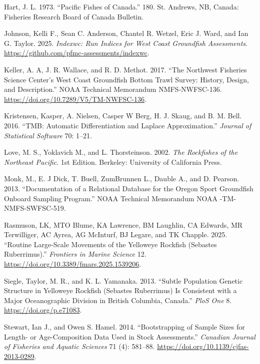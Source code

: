 \documentclass[
]{scrartcl}
\newlength{\cslhangindent}
\newenvironment{CSLReferences}[2] %
 {\begin{list}{}{%
  \setlength{\itemindent}{0pt}
  \setlength{\leftmargin}{0pt}
  \setlength{\parsep}{0pt}
  \ifodd #1
   \setlength{\leftmargin}{\cslhangindent}
   \setlength{\itemindent}{-1\cslhangindent}
  \fi
  \setlength{\itemsep}{#2\baselineskip}}}
 {\end{list}}
\begin{document}
\begin{CSLReferences}{1}{0}
Hart, J. L. 1973. {``Pacific Fishes of {C}anada.''} 180. St. Andrews,
NB, Canada: Fisheries Research Board of Canada Bulletin.

Johnson, Kelli F., Sean C. Anderson, Chantel R. Wetzel, Eric J. Ward,
and Ian G. Taylor. 2025. \emph{Indexwc: Run Indices for West Coast
Groundfish Assessments}.
\url{https://github.com/pfmc-assessments/indexwc}.

Keller, A. A, J. R. Wallace, and R. D. Methot. 2017. {``The Northwest
Fisheries Science Center's West Coast Groundfish Bottom Trawl Survey:
History, Design, and Description.''} NOAA Technical Memorandum
NMFS-NWFSC-136. \url{https://doi.org/10.7289/V5/TM-NWFSC-136}.

Kristensen, Kasper, A. Nielsen, Casper W Berg, H. J. Skaug, and B. M.
Bell. 2016. {``{TMB}: {Automatic} {Differentiation} and {Laplace}
{Approximation}.''} \emph{Journal of Statistical Software} 70: 1--21.

Love, M. S., Yoklavich M., and L. Thorsteinson. 2002. \emph{The
{Rockfishes} of the {Northeast} {Pacific}}. 1st Edition. Berkeley:
University of California Press.

Monk, M., E. J Dick, T. Buell, ZumBrunnen L., Dauble A., and D. Pearson.
2013. {``Documentation of a Relational Database for the Oregon Sport
Groundfish Onboard Sampling Program.''} NOAA Technical Memorandum NOAA
-TM-NMFS-SWFSC-519.

Rasmuson, LK, MTO Blume, KA Lawrence, BM Laughlin, CA Edwards, MR
Terwilliger, AC Ayrea, AG McInturf, BJ Legare, and TK Chapple. 2025.
{``Routine Large-Scale Movements of the Yelloweye Rockfish (Sebastes
Ruberrimus).''} \emph{Frontiers in Marine Science} 12.
\url{https://doi.org/10.3389/fmars.2025.1539206}.

Siegle, Taylor, M. R., and K. L. Yamanaka. 2013. {``Subtle Population
Genetic Structure in Yelloweye Rockfish (Sebastes Ruberrimus) Is
Consistent with a Major Oceanographic Division in British Columbia,
Canada.''} \emph{PloS One} 8. \url{https://doi.org/p.e71083}.

Stewart, Ian J., and Owen S. Hamel. 2014. {``Bootstrapping of Sample
Sizes for Length- or Age-Composition Data Used in Stock Assessments.''}
\emph{Canadian Journal of Fisheries and Aquatic Sciences} 71 (4):
581--88. \url{https://doi.org/10.1139/cjfas-2013-0289}.


\end{CSLReferences}
\end{document}
